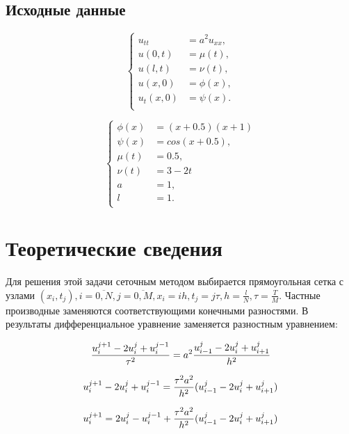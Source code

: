 \documentclass[a4paper,12pt]{article}
\begin{document}
\subsection{Исходные данные}

\[
\left\{
\begin{array}{rl}
u_{tt} &= a^2 u_{xx},  \\
u(0, t) &= \mu(t), \\
u(l, t) &= \nu(t), \\
u(x, 0) &= \phi(x), \\
u_t(x, 0) &= \psi(x). \\
\end{array}
\right.
\]


\[
\left\{
\begin{array}{rl}
\phi(x) &= (x+0.5)(x+1) \\
\psi(x) &= cos(x+0.5), \\
\mu(t) &= 0.5, \\
\nu(t) &= 3-2t \\
a &= 1, \\
l &= 1. \\
\end{array}
\right.
\]


\newpage
\section{Теоретические сведения}

Для решения этой задачи сеточным методом выбирается прямоугольная сетка с узлами $(x_i,t_j), i=\overline{0,N}, j=\overline{0,M}, x_i=ih, t_j=j\tau, h=\frac{l}N, \tau=\frac{T}M $. Частные производные заменяются соответствующими конечными разностями. В результаты дифференциальное уравнение заменяется разностным уравнением:

\begin{equation}
\frac{u^{j+1}_i - 2 u^j_i + u^{j-1}_i}{\tau^2} = a^2 \frac{u^j_{i-1} - 2u^j_i + u^j_{i+1}}{h^2}\\
\end{equation}

\begin{equation}
u^{j+1}_i - 2 u^j_i + u^{j-1}_i = \frac{\tau^2 a^2}{h^2} (u^j_{i-1} - 2u^j_i + u^j_{i+1})\\
\end{equation}

\begin{equation}
u^{j+1}_i = 2 u^j_i - u^{j-1}_i + \frac{\tau^2 a^2}{h^2} (u^j_{i-1} - 2u^j_i + u^j_{i+1})\\
\end{equation}
\end{document}
